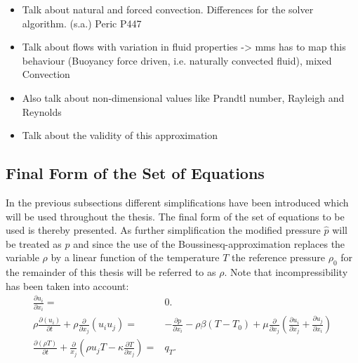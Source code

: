       \begin{itemize}
        \item Talk about natural and forced convection. Differences for the solver algorithm. (s.a.) Peric P447
        \item Talk about flows with variation in fluid properties -> mms has to map this behaviour (Buoyancy force driven, i.e. naturally convected fluid), mixed Convection
        \item Also talk about non-dimensional values like Prandtl number, Rayleigh and Reynolds
        \item Talk about the validity of this approximation
      \end{itemize}
      
    \subsection{Final Form of the Set of Equations}

    In the previous subsections different simplifications have been introduced which will be used throughout the thesis. The final form of the set of equations to be used is thereby presented. As further simplification the modified pressure \(\hat{p}\) will be treated as \(p\) and since the use of the Boussinesq-approximation replaces the variable \(\rho\) by a linear function of the temperature \(T\) the reference pressure \(\rho_0\) for the remainder of this thesis will be referred to as \(\rho\). Note that incompressibility has been taken into account:
    \begin{subequations}
      \label{eq:completeset}
    \begin{align}
      \label{eq:contidiff}
      \frac{\partial u_i}{\partial x_i} =& 0. \\[1em]
      \label{eq:momentumdiff}
        \rho \frac{\partial \left( u_i \right)}{\partial t} 
        + \rho \frac{\partial}{\partial x_j} \left( u_i  u_j \right) 
        =& - \frac{\partial p}{\partial x_i} 
        - \rho \beta \left( T - T_0 \right)
        +  \mu \frac{\partial}{\partial x_j} \left( \frac{\partial u_i}{\partial x_j} 
        + \frac{\partial u_j}{\partial x_i} \right) \\[1em]
    \label{eq:temperaturediff}
    \frac{\partial \left(\rho T \right)}{\partial t} + \frac{\partial}{x_j} \left( \rho u_j T - \kappa \frac{\partial T}{\partial x_j} \right) =& q_T.
    \end{align}
  \end{subequations}
